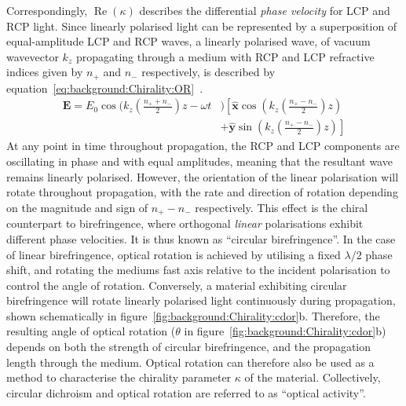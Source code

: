 Correspondingly, $\operatorname{Re}(\kappa)$ describes the differential \textit{phase velocity} for LCP and RCP light. Since linearly polarised light can be represented by a superposition of equal-amplitude LCP and RCP waves, a linearly polarised wave, of vacuum wavevector $k_z$ propagating through a medium with RCP and LCP refractive indices given by $n_+$ and $n_-$ respectively, is described by equation~\ref{eq:background:Chirality:OR}~\cite[\S 8.10]{Hecht2013}.
\begin{equation}\label{eq:background:Chirality:OR}
    \begin{split}
        \mathbf{E} = E_0 \cos(k_z (\frac{n_+ + n_-}{2})z -\omega t &) \left[ \mathbf{\hat{x}} \cos(k_z (\frac{n_+ - n_-}{2})z ) \right. \\
        & \left. + \mathbf{\hat{y}} \sin(k_z (\frac{n_+ - n_-}{2}) z)\right]
    \end{split}
\end{equation}
At any point in time throughout propagation, the RCP and LCP components are oscillating in phase and with equal amplitudes, meaning that the resultant wave remains linearly polarised. However, the orientation of the linear polarisation will rotate throughout propagation, with the rate and direction of rotation depending on the magnitude and sign of $n_+ - n_-$ respectively. This effect is the chiral counterpart to birefringence, where orthogonal \textit{linear} polarisations exhibit different phase velocities. It is thus known as ``circular birefringence''. In the case of linear birefringence, optical rotation is achieved by utilising a fixed $\lambda/2$ phase shift, and rotating the mediums fast axis relative to the incident polarisation to control the angle of rotation. Conversely, a material exhibiting circular birefringence will rotate linearly polarised light continuously during propagation, shown schematically in figure~\ref{fig:background:Chirality:cdor}b. Therefore, the resulting angle of optical rotation ($\theta$ in figure~\ref{fig:background:Chirality:cdor}b) depends on both the strength of circular birefringence, and the propagation length through the medium. Optical rotation can therefore also be used as a method to characterise the chirality parameter $\kappa$ of the material. Collectively, circular dichroism and optical rotation are referred to as ``optical activity''.

